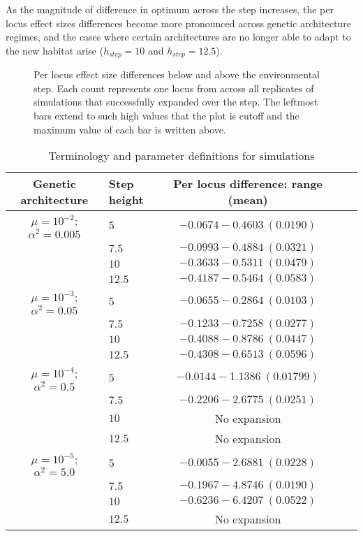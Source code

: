 As the magnitude of difference in optimum across the step increases, the per locus effect sizes differences become more pronounced across genetic architecture regimes, and the cases where certain architectures are no longer able to adapt to the new habitat arise ($h_{step} = 10$ and $h_{step} = 12.5$).


\begin{figure}[h]
\centering
{}
\caption[Per locus effect size differences.]{Per locus effect size differences below and above the environmental step. Each count represents one locus from across all replicates of simulations that successfully expanded over the step. The leftmost bars extend to such high values that the plot is cutoff and the maximum value of each bar is written above.}
\label{fig:effectsizes}
\end{figure}


\begin{table}[h]
\centering \footnotesize
\caption{Terminology and parameter definitions for simulations}
\label{tab:params}
\begin{tabular}{cp{}cp{}c}
Genetic architecture				&	Step height	&	Per locus difference: range (mean)  \\ \hline \hline
$\mu = 10^{-2}$; $\alpha^2 = 0.005$	& $5$	& $-0.0674 - 0.4603 ~ (0.0190)$	\\ 
							& $7.5$	& $-0.0993 - 0.4884 ~ (0.0321)$	\\ 
							& $10$	& $-0.3633 - 0.5311 ~ (0.0479)$	\\ 
							& $12.5$	& $-0.4187 - 0.5464 ~ (0.0583)$	\\ \hline
$\mu = 10^{-3}$; $\alpha^2 = 0.05$	& $5$	& $-0.0655 - 0.2864 ~ (0.0103)$	\\ 
							& $7.5$	& $-0.1233 - 0.7258 ~ (0.0277)$	\\ 
							& $10$	& $-0.4088 - 0.8786 ~ (0.0447)$	\\ 
							& $12.5$	& $-0.4308 - 0.6513 ~ (0.0596)$	\\ \hline
$\mu = 10^{-4}$; $\alpha^2 = 0.5$	& $5$	& $-0.0144 - 1.1386 ~ (0.01799)$	\\ 
							& $7.5$	& $-0.2206 - 2.6775 ~ (0.0251)$	\\ 
							& $10$	& No expansion	\\ 
							& $12.5$	& No expansion	\\ \hline
$\mu = 10^{-5}$; $\alpha^2 = 5.0$	& $5$	& ${-0.0055} - 2.6881 ~ (0.0228)$	\\ 
							& $7.5$	& $-0.1967 - 4.8746 ~ (0.0190)$	\\ 
							& $10$	& $-0.6236 - 6.4207 ~ (0.0522)$	\\ 
							& $12.5$	& No expansion	\\ \hline
\end{tabular}
\end{table}



